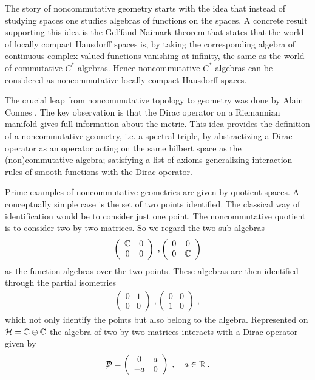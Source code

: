 \documentclass[12pt]{article}
\newcommand{\ba}{\begin{eqnarray}}
\newcommand{\ea}{\end{eqnarray}}
\def\cd{{\cal D}}
\def\ch{{\cal H}}
\newcommand{\bbC}{{\Bbb C}}
\newcommand{\bbR}{{\Bbb R}}
\begin{document}
The story of noncommutative geometry starts with the idea that instead of
studying spaces one studies  algebras of functions on the spaces. A concrete
result supporting this idea is the Gel'fand-Naimark theorem \cite{gelfand} that states that the world of
locally compact Hausdorff spaces is, by taking the corresponding algebra of continuous
complex valued functions vanishing at infinity, the same as
the world of commutative $C^*$-algebras. Hence noncommutative $C^*$-algebras
can be considered as noncommutative locally compact Hausdorff spaces.

The crucial leap from noncommutative topology to geometry was done by Alain
Connes \cite{ConnesBook}. The key observation is that the Dirac operator on a Riemannian
manifold gives full information about the metric. This idea provides the
definition of a noncommutative geometry, i.e. a spectral triple, by
abstractizing a Dirac operator as an operator acting on the same hilbert space
as the (non)commutative algebra; satisfying a list of axioms generalizing
interaction rules of smooth functions with the Dirac operator.
 
Prime examples of noncommutative geometries are given by quotient spaces. A 
conceptually simple case is the set of two points identified. The classical
way of identification would be to consider just one point. The noncommutative
quotient is to consider two by two matrices. So we regard the two
sub-algebras 
\ba
\left(
\begin{array}{cc}
\bbC & 0 \\
0 & 0
\end{array}
\right)\;,
\left(
\begin{array}{cc}
0 & 0 \\
0 & \bbC
\end{array}
\right)\nonumber
\ea
as the function algebras over the two points. These algebras are then
identified through the partial isometries 
\ba
\left(
\begin{array}{cc}
0 & 1 \\
0 & 0
\end{array}
\right)\;,
\left(
\begin{array}{cc}
0 & 0 \\
1 & 0
\end{array}
\right)\nonumber\;,
\ea
which not only identify the points but also belong to the
algebra. Represented on $\ch=\bbC\oplus\bbC$ the algebra of two by two
matrices interacts with a Dirac operator given by
\ba
\displaystyle{\not}\cd=\left(
\begin{array}{cc}
0 & a \\
-a & 0
\end{array}
\right)\nonumber\;,\quad a\in\bbR\;.
\ea
\end{document}
